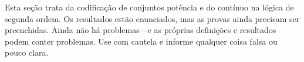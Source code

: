 \documentclass[../../../include/open-logic-chapter]{subfiles}
\begin{document}

\begin{editorial}
Esta seção trata da codificação de conjuntos potência e do contínuo na
lógica de segunda ordem. Os resultados estão enunciados, mas as provas ainda
precisam ser preenchidas. Ainda não há problemas---e as próprias definições
e resultados podem conter problemas. Use com cautela e informe qualquer
coisa falsa ou pouco clara.
\end{editorial}





\OLEndChapterHook
\end{document}

